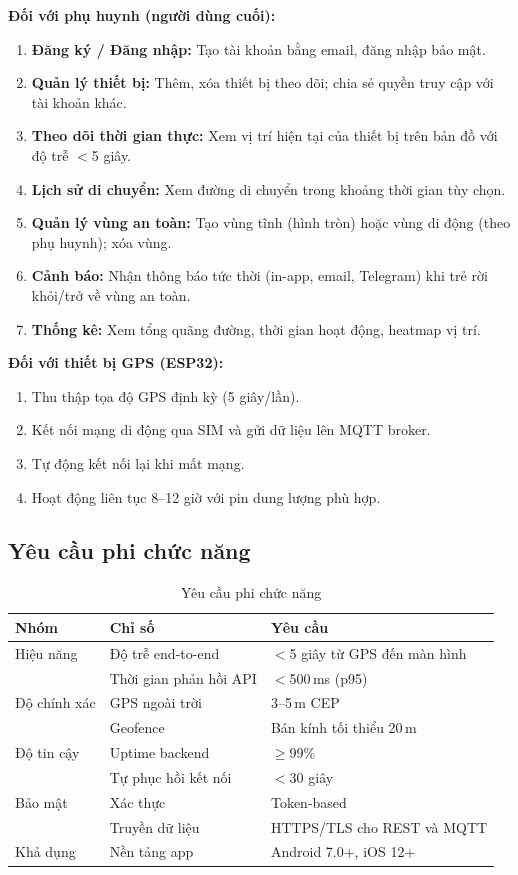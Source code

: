 \documentclass[13pt, a4paper]{report}
\begin{document}
\textbf{Đối với phụ huynh (người dùng cuối):}
\begin{enumerate}
  \item \textbf{Đăng ký / Đăng nhập:} Tạo tài khoản bằng email, đăng nhập bảo mật.
  \item \textbf{Quản lý thiết bị:} Thêm, xóa thiết bị theo dõi; chia sẻ quyền truy cập với tài khoản khác.
  \item \textbf{Theo dõi thời gian thực:} Xem vị trí hiện tại của thiết bị trên bản đồ với độ trễ $<$5 giây.
  \item \textbf{Lịch sử di chuyển:} Xem đường di chuyển trong khoảng thời gian tùy chọn.
  \item \textbf{Quản lý vùng an toàn:} Tạo vùng tĩnh (hình tròn) hoặc vùng di động (theo phụ huynh); xóa vùng.
  \item \textbf{Cảnh báo:} Nhận thông báo tức thời (in-app, email, Telegram) khi trẻ rời khỏi/trở về vùng an toàn.
  \item \textbf{Thống kê:} Xem tổng quãng đường, thời gian hoạt động, heatmap vị trí.
\end{enumerate}

\textbf{Đối với thiết bị GPS (ESP32):}
\begin{enumerate}
  \item Thu thập tọa độ GPS định kỳ (5 giây/lần).
  \item Kết nối mạng di động qua SIM và gửi dữ liệu lên MQTT broker.
  \item Tự động kết nối lại khi mất mạng.
  \item Hoạt động liên tục 8--12 giờ với pin dung lượng phù hợp.
\end{enumerate}

\subsection{Yêu cầu phi chức năng}

\begin{table}[H]
\centering
\caption{Yêu cầu phi chức năng}
\label{tab:nonfunctional}
\begin{tabularx}{\textwidth}{l l X}
\toprule
\textbf{Nhóm} & \textbf{Chỉ số} & \textbf{Yêu cầu} \\
\midrule
Hiệu năng & Độ trễ end-to-end      & $<$5 giây từ GPS đến màn hình \\
          & Thời gian phản hồi API & $<$500\,ms (p95) \\
\midrule
Độ chính xác & GPS ngoài trời & 3--5\,m CEP \\
             & Geofence       & Bán kính tối thiểu 20\,m \\
\midrule
Độ tin cậy & Uptime backend          & $\geq$99\% \\
           & Tự phục hồi kết nối    & $<$30 giây \\
\midrule
Bảo mật & Xác thực        & Token-based \\
        & Truyền dữ liệu  & HTTPS/TLS cho REST và MQTT \\
\midrule
Khả dụng & Nền tảng app & Android 7.0+, iOS 12+ \\
\bottomrule
\end{tabularx}
\end{table}
\end{document}
